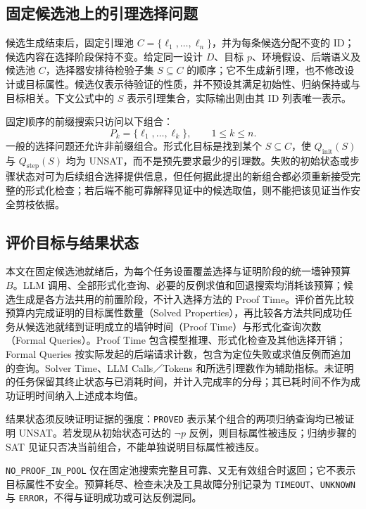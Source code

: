 \subsection{固定候选池上的引理选择问题}

候选生成结束后，固定引理池 $C=\{\ell_1,\ldots,\ell_n\}$，并为每条候选分配不变的 ID；候选内容在选择阶段保持不变。给定同一设计 $D$、目标 $p$、环境假设、后端语义及候选池 $C$，选择器安排待检验子集 $S\subseteq C$ 的顺序；它不生成新引理，也不修改设计或目标属性。候选仅表示待验证的性质，并不预设其满足初始性、归纳保持或与目标相关。下文公式中的 $S$ 表示引理集合，实际输出则由其 ID 列表唯一表示。

固定顺序的前缀搜索只访问以下组合：
\[
P_k=\{\ell_1,\ldots,\ell_k\},\qquad 1\le k\le n.
\]
一般的选择问题还允许非前缀组合。形式化目标是找到某个 $S\subseteq C$，使 $Q_{\mathrm{init}}(S)$ 与 $Q_{\mathrm{step}}(S)$ 均为 UNSAT，而不是预先要求最少的引理数。失败的初始状态或步骤状态对可为后续组合选择提供信息，但任何据此提出的新组合都必须重新接受完整的形式化检查；若后端不能可靠解释见证中的候选取值，则不能把该见证当作安全剪枝依据。

\subsection{评价目标与结果状态}

本文在固定候选池就绪后，为每个任务设置覆盖选择与证明阶段的统一墙钟预算 $B$。LLM 调用、全部形式化查询、必要的反例求值和回退搜索均消耗该预算；候选生成是各方法共用的前置阶段，不计入选择方法的 Proof Time。评价首先比较预算内完成证明的目标属性数量（Solved Properties），再比较各方法共同成功任务从候选池就绪到证明成立的墙钟时间（Proof Time）与形式化查询次数（Formal Queries）。Proof Time 包含模型推理、形式化检查及其他选择开销；Formal Queries 按实际发起的后端请求计数，包含为定位失败或求值反例而追加的查询。Solver Time、LLM Calls／Tokens 和所选引理数作为辅助指标。未证明的任务保留其终止状态与已消耗时间，并计入完成率的分母；其已耗时间不作为成功证明时间纳入上述成本均值。

结果状态须反映证明证据的强度：\texttt{PROVED} 表示某个组合的两项归纳查询均已被证明 UNSAT。若发现从初始状态可达的 $\neg p$ 反例，则目标属性被违反；归纳步骤的 SAT 见证只否决当前组合，不能单独说明目标属性被违反。

\texttt{NO\_PROOF\_IN\_POOL} 仅在固定池搜索完整且可靠、又无有效组合时返回；它不表示目标属性不安全。预算耗尽、检查未决及工具故障分别记录为 \texttt{TIMEOUT}、\texttt{UNKNOWN} 与 \texttt{ERROR}，不得与证明成功或可达反例混同。
